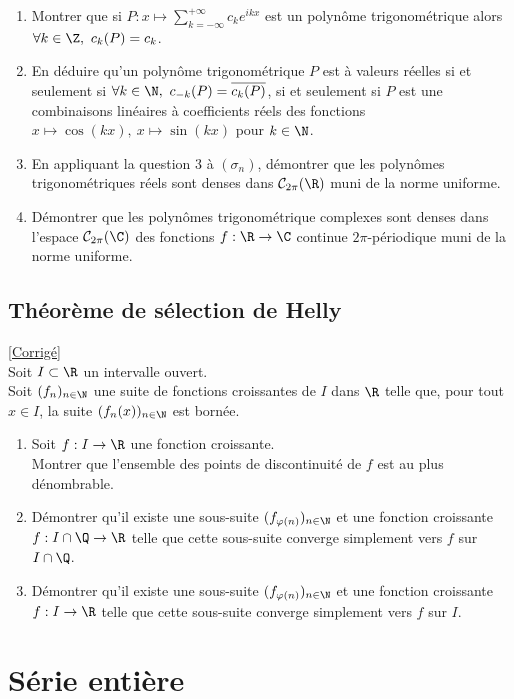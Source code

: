 \documentclass{book}
\begin{document}
	\begin{enumerate}[resume]
		\item Montrer que si $P:x\mapsto \displaystyle\sum_{k=-\infty}^{+\infty}c_ke^{ikx}$ est un polynôme trigonométrique alors $\forall k\in \Z,\ c_k(P)=c_k$.
		\item En déduire qu'un polynôme trigonométrique $P$ est à valeurs réelles si et seulement si $\forall k\in \N,\ c_{-k}(P)=\overline{c_k(P)}$, si et seulement si $P$ est une combinaisons linéaires à coefficients réels des fonctions $x\mapsto \cos(kx),\ x\mapsto \sin(kx)$ pour $k\in \N$.
		\item En appliquant la question 3 à $(\sigma_n)$, démontrer que les polynômes trigonométriques réels sont denses dans $\mathcal C_{2\pi}(\R)$ muni de la norme uniforme.
		\item Démontrer que les polynômes trigonométrique complexes sont denses dans l'espace $\mathcal C_{2\pi}(\C)$ des fonctions $f:\R\to \C$ continue $2\pi$-périodique muni de la norme uniforme.
	\end{enumerate}
	
	\section{Théorème de sélection de Helly }
	\textcolor{blue}{\hyperref[Théorème de sélection de Helly corrigé]{[Corrigé]}}\\
	\label{Théorème de sélection de Helly}
	Soit $I\subset \R$ un intervalle ouvert.\\
	Soit $(f_n)_{n\in \N}$ une suite de fonctions croissantes de $I$ dans $\R$ telle que, pour tout $x\in I$, la suite $(f_n(x))_{n\in \N}$ est bornée.
	\begin{enumerate}
		\item Soit $f:I\to \R$ une fonction croissante.\\
		Montrer que l'ensemble des points de discontinuité de $f$ est au plus dénombrable.
		\item Démontrer qu'il existe une sous-suite $(f_{\varphi(n)})_{n\in \N}$ et une fonction croissante $f:I\cap \Q \to\R$ telle que cette sous-suite converge simplement vers $f$ sur $I\cap \Q$.
		\item Démontrer qu'il existe une sous-suite $(f_{\varphi(n)})_{n\in \N}$ et une fonction croissante $f:I \to\R$ telle que cette sous-suite converge simplement vers $f$ sur $I$.
	\end{enumerate}

\chapter{Série entière}
\end{document}

